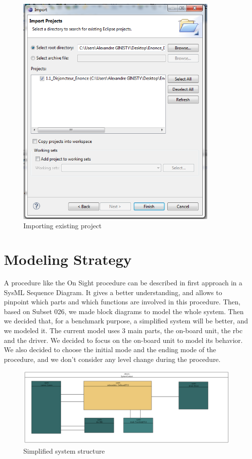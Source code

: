 \documentclass{template/openetcs_article}
\begin{document}
\begin{figure}[h!]
  \centering
  \includegraphics[width=10cm]{fig3_importing_existing_project.png}
  \caption{Importing existing project}
  \label{fig: Importing existing project}
\end{figure}

\section{Modeling Strategy }
A procedure like the On Sight procedure can be described in first approach in a SysML Sequence Diagram. It gives a better understanding, and allows to pinpoint which parts and which functions are involved in this procedure.
Then, based on Subset 026, we made block diagrams to model the whole system. Then we decided that, for a benchmark purpose, a simplified system will be better, and we modeled it.
The current model uses 3 main parts, the on-board unit, the rbc and the driver. We decided to focus on the on-board unit to model its behavior. We also decided to choose the initial mode and the ending mode of the procedure, and we don’t consider any level change during the procedure.

\begin{figure}[h]
  \centering
  \includegraphics[width=14cm]{fig4_simplified_system_structure.png}
  \caption{Simplified system structure}
  \label{fig: Simplified system structure}
\end{figure}
\end{document}
